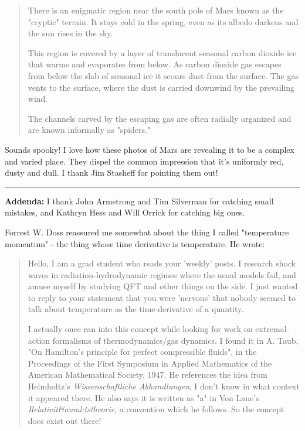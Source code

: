 \begin{quote}
  There is an enigmatic region near the south pole of Mars known as
  the "cryptic" terrain. It stays cold in the spring, even as its
  albedo darkens and the sun rises in the sky.

  This region is covered by a layer of translucent seasonal carbon
  dioxide ice that warms and evaporates from below. As carbon dioxide
  gas escapes from below the slab of seasonal ice it scours dust from
  the surface. The gas vents to the surface, where the dust is carried
  downwind by the prevailing wind.

  The channels carved by the escaping gas are often radially organized
  and are known informally as "spiders."
\end{quote}

Sounds spooky!  I love how these photos of Mars are revealing it to be
a complex and varied place.  They dispel the common impression that
it's uniformly red, dusty and dull.  I thank Jim Stasheff for pointing
them out!

\par\noindent\rule{\textwidth}{0.4pt}

\textbf{Addenda:} 
I thank John Armstrong and Tim Silverman for catching small
mistakes, and Kathryn Hess and Will Orrick for catching big ones.

Forrest W. Doss reassured me somewhat about the thing I
called "temperature momentum" - the thing whose time
derivative is temperature.  He wrote:

\begin{quote}
Hello, I am a grad student who reads your 'weekly' posts.  I research
shock waves in radiation-hydrodynamic regimes where the usual models
fail, and amuse myself by studying QFT and other things on the side.
I just wanted to reply to your statement that you were 'nervous' that
nobody seemed to talk about temperature as the time-derivative of a
quantity.

I actually once ran into this concept while looking for work on
extremal-action formalisms of thermodynamics/gas dynamics.  I found it
in A. Taub, "On Hamilton's principle for perfect compressible fluids",
in the Proceedings of the First Symposium in Applied Mathematics of
the American Mathematical Society, 1947.  He references the idea from
Helmholtz's \emph{Wissenschaftliche Abhandlungen}, I don't know in
what context it appeared there. He also says it is written as "a" in
Von Laue's \emph{Relativit&auml;tstheorie}, a convention which he
follows.  So the concept does exist out there!  
\end{quote}

